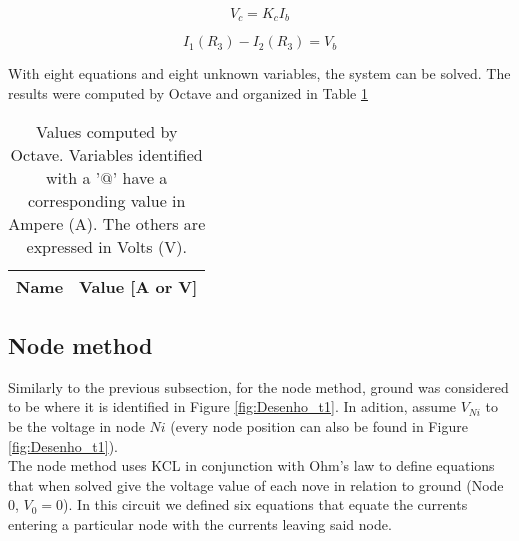\begin{equation}
	V_c = K_cI_b
	\label{eq:depsrc2}
\end{equation}

\begin{equation}
	I_1(R_3)-I_2(R_3) = V_b
	\label{eq:rel_ohm1}
\end{equation}

With eight equations and eight unknown variables, the system can be solved.
The results were computed by Octave and organized in Table \ref{tab:mesh}

\begin{table}[h]
	\centering
	\begin{tabular}{|l|r|}
    		\hline    
    		{\bf Name} & {\bf Value [A or V]} \\ \hline
    		
  	\end{tabular}
  	\caption{Values computed by Octave. Variables identified with a '$@$' have a
  	corresponding value in Ampere (A). The others are expressed in Volts (V).}
 
\label{tab:mesh}
\end{table}




\subsection{Node method}
\label{subsec:node_met}


Similarly to the previous subsection, for the node method, ground was considered to be where it is identified in
Figure \ref{fig:Desenho_t1}. In adition, assume $V_{Ni}$ to be the voltage in node $Ni$ (every node position can
also be found in Figure \ref{fig:Desenho_t1}). \\




The node method uses KCL in conjunction with Ohm’s law to define equations that when solved give the voltage value 
of each nove in relation to ground (Node 0, $V_0 = 0$). In this circuit we defined six equations that equate the 
currents entering a particular node with the currents leaving said node. 

